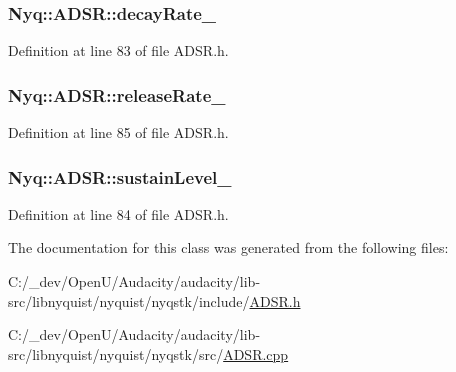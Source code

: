 \subsubsection[{\texorpdfstring{decay\+Rate\+\_\+}{decayRate_}}]{ Nyq\+::\+A\+D\+S\+R\+::decay\+Rate\+\_\+\hspace{0.3cm}{\ttfamily [protected]}}\hypertarget{class_nyq_1_1_a_d_s_r_a27534e216f2f4337688dfb7105119485}{}\label{class_nyq_1_1_a_d_s_r_a27534e216f2f4337688dfb7105119485}


Definition at line 83 of file A\+D\+S\+R.\+h.

\subsubsection[{\texorpdfstring{release\+Rate\+\_\+}{releaseRate_}}]{ Nyq\+::\+A\+D\+S\+R\+::release\+Rate\+\_\+\hspace{0.3cm}{\ttfamily [protected]}}\hypertarget{class_nyq_1_1_a_d_s_r_a224b06adedecf54779cbf4e8bc1426c2}{}\label{class_nyq_1_1_a_d_s_r_a224b06adedecf54779cbf4e8bc1426c2}


Definition at line 85 of file A\+D\+S\+R.\+h.

\subsubsection[{\texorpdfstring{sustain\+Level\+\_\+}{sustainLevel_}}]{ Nyq\+::\+A\+D\+S\+R\+::sustain\+Level\+\_\+\hspace{0.3cm}{\ttfamily [protected]}}\hypertarget{class_nyq_1_1_a_d_s_r_aaf88673c1a570c209c6eff11c5b8adbb}{}\label{class_nyq_1_1_a_d_s_r_aaf88673c1a570c209c6eff11c5b8adbb}


Definition at line 84 of file A\+D\+S\+R.\+h.



The documentation for this class was generated from the following files\+:\begin{DoxyCompactItemize}
\item 
C\+:/\+\_\+dev/\+Open\+U/\+Audacity/audacity/lib-\/src/libnyquist/nyquist/nyqstk/include/\hyperlink{_a_d_s_r_8h}{A\+D\+S\+R.\+h}\item 
C\+:/\+\_\+dev/\+Open\+U/\+Audacity/audacity/lib-\/src/libnyquist/nyquist/nyqstk/src/\hyperlink{_a_d_s_r_8cpp}{A\+D\+S\+R.\+cpp}\end{DoxyCompactItemize}
